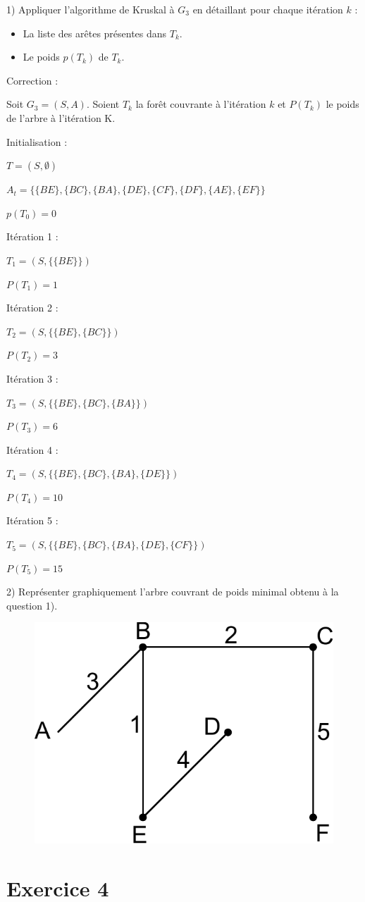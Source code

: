 \documentclass[a4paper,11pt]{article}
\begin{document}
1) Appliquer l'algorithme de Kruskal à $G_3$ en détaillant pour chaque itération $k$ : 
\begin{itemize}
	\item La liste des arêtes présentes dans $T_k$.
	\item Le poids $p(T_k)$ de $T_k$.
\end{itemize}

Correction :

Soit $G_3=(S,A)$.
Soient $T_k$ la forêt couvrante à l'itération $k$ et $P(T_k)$ le poids de l'arbre à l'itération K.

Initialisation :

$T = (S, \emptyset)$

$A_t = \{\{BE\}, \{BC\}, \{BA\}, \{DE\}, \{CF\}, \{DF\}, \{AE\}, \{EF\}\}$

$p(T_0) = 0$

Itération 1 :

$T_1 = (S, \{\{BE\}\})$

$P(T_1) = 1$

Itération 2 :

$T_2 = (S, \{\{BE\}, \{BC\}\})$

$P(T_2) = 3$

Itération 3 :

$T_3 = (S, \{\{BE\}, \{BC\}, \{BA\}\})$

$P(T_3) = 6$

Itération 4 :

$T_4 = (S, \{\{BE\}, \{BC\}, \{BA\}, \{DE\}\})$

$P(T_4) = 10$

Itération 5 :

$T_5 = (S, \{\{BE\}, \{BC\}, \{BA\}, \{DE\}, \{CF\}\})$

$P(T_5) = 15$

2) Représenter graphiquement l'arbre couvrant de poids minimal obtenu à la question 1).

\begin{figure}[h!]
	\centering
	\includegraphics[width=0.25\linewidth]{./graphe3_correction.pdf}
\end{figure}

\section*{Exercice 4}
\end{document}
